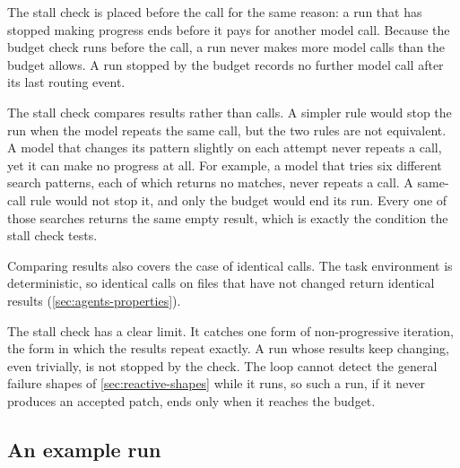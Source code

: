 The stall check is placed before the call for the same reason: a run that has stopped making
progress ends before it pays for another model call. Because the budget check runs before the call,
a run never makes more model calls than the budget allows. A run stopped by the budget records no
further model call after its last routing event.

The stall check compares results rather than calls. A simpler rule would stop the run when the model
repeats the same call, but the two rules are not equivalent. A model that changes its
 pattern slightly on each attempt never repeats a call, yet it can make no progress
at all. For example, a model that tries six different search patterns, each of which returns no
matches, never repeats a call. A same-call rule would not stop it, and only the budget would end its
run. Every one of those searches returns the same empty result, which is exactly the condition the
stall check tests.

Comparing results also covers the case of identical calls. The task environment is deterministic, so
identical calls on files that have not changed return identical results (\cref{sec:agents-properties}).

The stall check has a clear limit. It catches one form of non-progressive iteration, the form in
which the results repeat exactly. A run whose results keep changing, even trivially, is not stopped
by the check. The loop cannot detect the general failure shapes of \cref{sec:reactive-shapes} while
it runs, so such a run, if it never produces an accepted patch, ends only when it reaches the
budget.

\subsection{An example run}
\label{sec:reactive-run}

